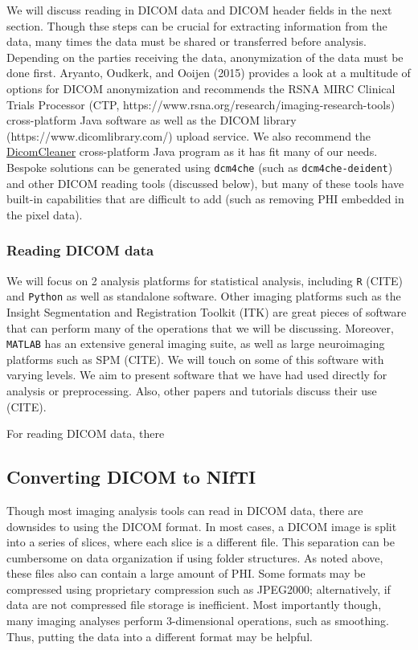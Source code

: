 \documentclass[]{elsarticle} %
\begin{document}
We will discuss reading in DICOM data and DICOM header fields in the
next section. Though thse steps can be crucial for extracting
information from the data, many times the data must be shared or
transferred before analysis. Depending on the parties receiving the
data, anonymization of the data must be done first. Aryanto, Oudkerk,
and Ooijen (2015) provides a look at a multitude of options for DICOM
anonymization and recommends the RSNA MIRC Clinical Trials Processor
(CTP, https://www.rsna.org/research/imaging-research-tools)
cross-platform Java software as well as the DICOM library
(https://www.dicomlibrary.com/) upload service. We also recommend the
\href{https://www.dclunie.com/pixelmed/software/webstart/DicomCleanerUsage.html}{DicomCleaner}
cross-platform Java program as it has fit many of our needs. Bespoke
solutions can be generated using \texttt{dcm4che} (such as
\texttt{dcm4che-deident}) and other DICOM reading tools (discussed
below), but many of these tools have built-in capabilities that are
difficult to add (such as removing PHI embedded in the pixel data).

\hypertarget{reading-dicom-data}{%
\subsubsection{Reading DICOM data}\label{reading-dicom-data}}

We will focus on 2 analysis platforms for statistical analysis,
including \texttt{R} (CITE) and \texttt{Python} as well as standalone
software. Other imaging platforms such as the Insight Segmentation and
Registration Toolkit (ITK) are great pieces of software that can perform
many of the operations that we will be discussing. Moreover,
\texttt{MATLAB} has an extensive general imaging suite, as well as large
neuroimaging platforms such as SPM (CITE). We will touch on some of this
software with varying levels. We aim to present software that we have
had used directly for analysis or preprocessing. Also, other papers and
tutorials discuss their use (CITE).

For reading DICOM data, there

\hypertarget{converting-dicom-to-nifti}{%
\subsection{Converting DICOM to NIfTI}\label{converting-dicom-to-nifti}}

Though most imaging analysis tools can read in DICOM data, there are
downsides to using the DICOM format. In most cases, a DICOM image is
split into a series of slices, where each slice is a different file.
This separation can be cumbersome on data organization if using folder
structures. As noted above, these files also can contain a large amount
of PHI. Some formats may be compressed using proprietary compression
such as JPEG2000; alternatively, if data are not compressed file storage
is inefficient. Most importantly though, many imaging analyses perform
3-dimensional operations, such as smoothing. Thus, putting the data into
a different format may be helpful.
\end{document}
